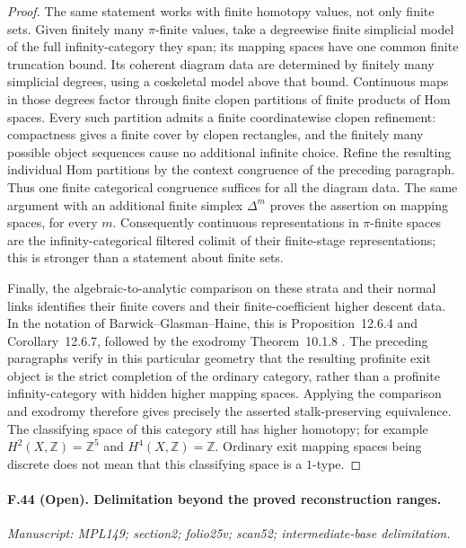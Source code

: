 \begin{proof}
The same statement works with finite homotopy values, not only finite
sets. Given finitely many $\pi$-finite values, take a degreewise finite
simplicial model of the full infinity-category they span; its mapping
spaces have one common finite truncation bound. Its coherent diagram
data are determined by finitely many simplicial degrees, using a
coskeletal model above that bound. Continuous maps in those degrees
factor through finite clopen partitions of finite products of Hom
spaces. Every such partition admits a finite coordinatewise clopen
refinement: compactness gives a finite cover by clopen rectangles,
and the finitely many possible object sequences cause no additional
infinite choice. Refine the resulting individual Hom partitions by
the context congruence of the preceding paragraph. Thus one finite
categorical congruence suffices for all the diagram data.
The same argument with an additional finite simplex
$\Delta^m$ proves the assertion on mapping spaces, for every $m$.
Consequently continuous representations in $\pi$-finite spaces are the
infinity-categorical filtered colimit of their finite-stage
representations; this is stronger than a statement about finite sets.

Finally, the algebraic-to-analytic comparison on these strata and their
normal links identifies their finite covers and their finite-coefficient
higher descent data. In the notation of Barwick--Glasman--Haine, this
is Proposition~12.6.4 and Corollary~12.6.7, followed by the exodromy
Theorem~10.1.8 \cite{BGH2020}. The preceding paragraphs verify in this
particular geometry that the resulting profinite exit object is the
strict completion of the ordinary category, rather than a profinite
infinity-category with hidden higher mapping spaces. Applying the
comparison and exodromy therefore gives precisely the asserted
stalk-preserving equivalence. The classifying space of this category
still has higher homotopy; for example $H^2(X,\mathbb Z)=\mathbb Z^5$
and $H^4(X,\mathbb Z)=\mathbb Z$. Ordinary exit mapping spaces being
discrete does not mean that this classifying space is a $1$-type.
\end{proof}

\paragraph{F.44 (Open). Delimitation beyond the proved reconstruction ranges.}
\textit{Manuscript: MPL149; section2; folio25v; scan52; intermediate-base delimitation.}

